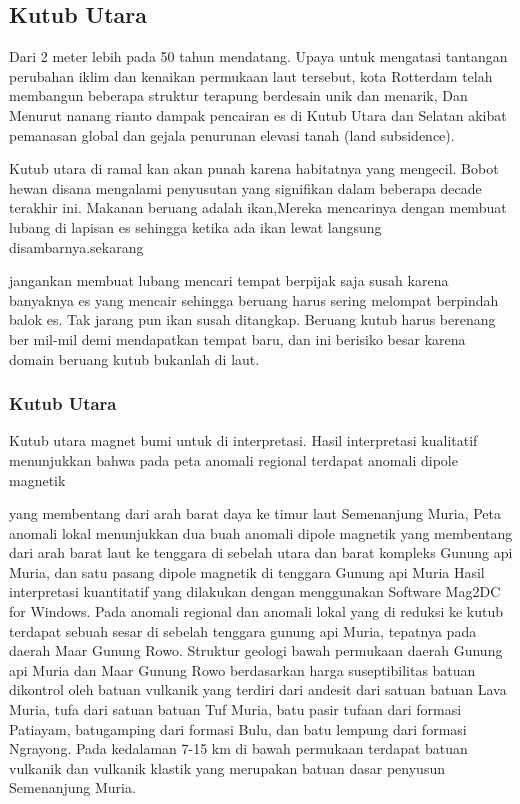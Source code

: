 \subsection{Kutub Utara}	
Dari 2 meter lebih pada 50 tahun 
	mendatang. Upaya untuk mengatasi tantangan perubahan iklim dan kenaikan permukaan laut tersebut, kota Rotterdam telah membangun beberapa struktur terapung 
	berdesain unik dan menarik, Dan Menurut nanang rianto dampak pencairan es di Kutub Utara dan Selatan akibat pemanasan global dan gejala penurunan elevasi
	tanah (land subsidence).
	
		Kutub utara di ramal kan akan punah karena habitatnya yang mengecil. Bobot hewan disana mengalami penyusutan yang signiﬁkan dalam beberapa decade terakhir ini. Makanan beruang adalah ikan,Mereka mencarinya dengan membuat lubang di lapisan es sehingga ketika ada ikan lewat langsung disambarnya.sekarang 

	jangankan membuat lubang mencari tempat berpijak saja susah karena banyaknya es yang mencair sehingga beruang harus sering melompat berpindah balok es.
	Tak jarang pun ikan susah ditangkap. Beruang kutub harus berenang ber mil-mil demi mendapatkan tempat baru, dan ini berisiko besar karena domain beruang
	kutub bukanlah di laut.
	
	

\subsubsection {Kutub Utara}
		Kutub utara magnet bumi untuk di interpretasi. Hasil interpretasi kualitatif menunjukkan bahwa pada peta anomali regional terdapat anomali dipole magnetik

	yang membentang dari arah barat daya ke timur laut Semenanjung Muria, Peta anomali lokal menunjukkan dua buah anomali dipole magnetik yang membentang dari 
	arah barat laut ke tenggara di sebelah utara dan barat kompleks Gunung api Muria, dan satu pasang dipole magnetik di tenggara Gunung api Muria Hasil 
	interpretasi kuantitatif yang dilakukan dengan menggunakan Software Mag2DC for Windows. Pada anomali regional dan anomali lokal yang di reduksi ke kutub 
	terdapat sebuah sesar di sebelah tenggara gunung api Muria, tepatnya pada daerah Maar Gunung Rowo. Struktur geologi bawah permukaan daerah Gunung api Muria 
	dan Maar Gunung Rowo berdasarkan harga suseptibilitas batuan dikontrol oleh batuan vulkanik yang terdiri dari andesit dari satuan batuan Lava Muria, tufa 
	dari satuan batuan Tuf Muria, batu pasir tufaan dari formasi Patiayam, batugamping dari formasi Bulu, dan batu lempung dari formasi Ngrayong. Pada kedalaman
	7-15 km di bawah permukaan terdapat batuan vulkanik dan vulkanik klastik yang merupakan batuan dasar penyusun Semenanjung Muria.
	
